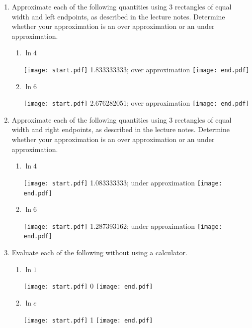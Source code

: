 \documentclass[12pt]{article}
\begin{document}
\begin{enumerate}

\item Approximate each of the following quantities using 3 rectangles of equal width and left endpoints, as described in the lecture notes.  Determine whether your approximation is an over approximation or an under approximation.

\begin{enumerate}

\item $\ln{4}$

\texttt{[image: start.pdf]}
{1.833333333; over approximation}
\texttt{[image: end.pdf]}


\item $\ln{6}$

\texttt{[image: start.pdf]}
{2.676282051; over approximation}
\texttt{[image: end.pdf]}


\end{enumerate}

\item Approximate each of the following quantities using 3 rectangles of equal width and right endpoints, as described in the lecture notes.   Determine whether your approximation is an over approximation or an under approximation.

\begin{enumerate}

\item $\ln{4}$

\texttt{[image: start.pdf]}
{{1.083333333; under approximation}}
\texttt{[image: end.pdf]}


\item $\ln{6}$

\texttt{[image: start.pdf]}
{{1.287393162; under approximation}}
\texttt{[image: end.pdf]}


\end{enumerate}

\item Evaluate each of the following without using a calculator.

\begin{enumerate}

\item $\ln{1}$

\texttt{[image: start.pdf]}
{0}
\texttt{[image: end.pdf]}


\item $\ln{e}$

\texttt{[image: start.pdf]}
{1}
\texttt{[image: end.pdf]}



\end{enumerate}
\end{enumerate}
\end{document}
